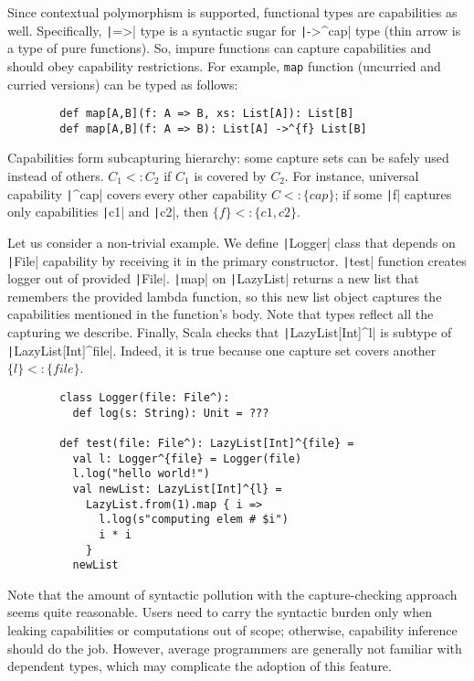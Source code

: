 \documentclass[conference]{IEEEtran}
\begin{document}
    Since contextual polymorphism is supported, functional types are capabilities as well.
    Specifically, \texttt|=>| type is a syntactic sugar for \texttt|->^{cap}| type (thin arrow is a type of pure functions).
    So, impure functions can capture capabilities and should obey capability restrictions.
    For example, \texttt{map} function (uncurried and curried versions) can be typed as follows:
    \begin{verbatim}
        def map[A,B](f: A => B, xs: List[A]): List[B]
        def map[A,B](f: A => B): List[A] ->^{f} List[B]
    \end{verbatim}

    Capabilities form subcapturing hierarchy: some capture sets can be safely used instead of others.
    $C_1 <: C_2$ if $C_1$ is covered by $C_2$.
    For instance, universal capability \texttt|^{cap}| covers every other capability $C <: \{cap\}$; if some \texttt|f| captures only capabilities \texttt|c1| and \texttt|c2|, then $\{f\} <: \{c1, c2\}$.

    Let us consider a non-trivial example.
    We define \texttt|Logger| class that depends on \texttt|File| capability by receiving it in the primary constructor.
    \texttt|test| function creates logger out of provided \texttt|File|.
    \texttt|map| on \texttt|LazyList| returns a new list that remembers the provided lambda function, so this new list object captures the capabilities mentioned in the function's body.
    Note that types reflect all the capturing we describe.
    Finally, Scala checks that \texttt|LazyList[Int]^{l}| is subtype of \texttt|LazyList[Int]^{file}|.
    Indeed, it is true because one capture set covers another $\{l\} <: \{file\}$.
    \begin{verbatim}
        class Logger(file: File^):
          def log(s: String): Unit = ???

        def test(file: File^): LazyList[Int]^{file} =
          val l: Logger^{file} = Logger(file)
          l.log("hello world!")
          val newList: LazyList[Int]^{l} =
            LazyList.from(1).map { i =>
              l.log(s"computing elem # $i")
              i * i
            }
          newList
    \end{verbatim}

    Note that the amount of syntactic pollution with the capture-checking approach seems quite reasonable.
    Users need to carry the syntactic burden only when leaking capabilities or computations out of scope; otherwise, capability inference should do the job.
    However, average programmers are generally not familiar with dependent types, which may complicate the adoption of this feature.
\end{document}
